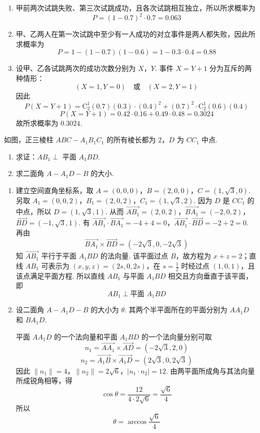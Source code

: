 \begin{solution}
\begin{enumerate}
\item 甲前两次试跳失败、第三次试跳成功，且各次试跳相互独立，所以所求概率为
\[
P=(1-0.7)^2\cdot0.7=0.063
\]
\item 甲、乙两人在第一次试跳中至少有一人成功的对立事件是两人都失败，因此所求概率为
\[
P=1-(1-0.7)(1-0.6)=1-0.3\cdot0.4=0.88
\]
\item 设甲、乙各试跳两次的成功次数分别为 \(X\)，\(Y\). 事件 \(X=Y+1\) 分为互斥的两种情形：
\[
(X=1,Y=0)\quad\text{或}\quad(X=2,Y=1)
\]
因此
\[
P(X=Y+1)=\mathrm C_2^1(0.7)(0.3)\cdot(0.4)^2
 +(0.7)^2\cdot\mathrm C_2^1(0.6)(0.4)
\]
\[
P(X=Y+1)=0.42\cdot0.16+0.49\cdot0.48=0.3024
\]
故所求概率为 \(0.3024\).
\end{enumerate}
\end{solution}

\begin{problem}
如图，正三棱柱 \(ABC - A_1B_1C_1\) 的所有棱长都为 \(2\)，\(D\) 为 \(CC_1\) 中点.

\begin{enumerate}
\item 求证：\(AB_1 \perp\) 平面 \(A_1BD\).
\item 求二面角 \(A-A_1D-B\) 的大小.
\end{enumerate}

\end{problem}

\begin{solution}
\begin{enumerate}
\item 建立空间直角坐标系，取 \(A=(0,0,0)\)，\(B=(2,0,0)\)，\(C=(1,\sqrt{3},0)\). 另取 \(A_1=(0,0,2)\)，\(B_1=(2,0,2)\)，\(C_1=(1,\sqrt{3},2)\). 因为 \(D\) 是 \(CC_1\) 的中点，所以 \(D=(1,\sqrt{3},1)\). 从而
\(\overrightarrow{AB_1}=(2,0,2)\)，\(\overrightarrow{BA_1}=(-2,0,2)\)，\(\overrightarrow{BD}=(-1,\sqrt{3},1)\).
有
\(\overrightarrow{AB_1}\cdot\overrightarrow{BA_1}=-4+4=0\)，\(\overrightarrow{AB_1}\cdot\overrightarrow{BD}=-2+2=0\).
再由
\[
\overrightarrow{BA_1}\times\overrightarrow{BD}=(-2\sqrt{3},0,-2\sqrt{3})
\]
知 \(\overrightarrow{AB_1}\) 平行于平面 \(A_1BD\) 的法向量. 该平面过点 \(B\)，故方程为 \(x+z=2\)；直线 \(AB_1\) 可表示为 \((x,y,z)=(2s,0,2s)\)，在 \(s=\frac12\) 时经过点 \((1,0,1)\)，且该点满足平面方程. 所以直线 \(AB_1\) 与平面 \(A_1BD\) 相交且方向垂直于该平面，即
\[
AB_1\perp\text{平面 }A_1BD
\]
\item 设二面角 \(A-A_1D-B\) 的大小为 \(\theta\). 其两个半平面所在的平面分别为 \(AA_1D\) 和 \(BA_1D\).

平面 \(AA_1D\) 的一个法向量和平面 \(A_1BD\) 的一个法向量分别可取
\[
n_1=\overrightarrow{AA_1}\times\overrightarrow{AD}
 =(-2\sqrt{3},2,0)
\]
\[
n_2=\overrightarrow{A_1B}\times\overrightarrow{A_1D}
 =(2\sqrt{3},0,2\sqrt{3})
\]
因此 \(\lVert n_1\rVert=4\)，\(\lVert n_2\rVert=2\sqrt{6}\)，\(\left|n_1\cdot n_2\right|=12\).
由两平面所成角与其法向量所成锐角相等，得
\[
\cos\theta=\frac{12}{4\cdot2\sqrt{6}}=\frac{\sqrt{6}}{4}
\]
所以
\[
\theta=\arccos\frac{\sqrt{6}}{4}
\]
\end{enumerate}
\end{solution}

